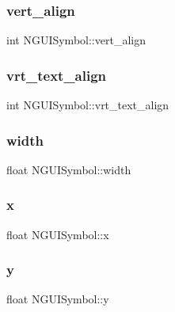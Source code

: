 \hypertarget{class_n_g_u_i_symbol_acdc9d16a07feb428f3323e4760c34b0d}{}\label{class_n_g_u_i_symbol_acdc9d16a07feb428f3323e4760c34b0d} 
\subsubsection{\texorpdfstring{vert\+\_\+align}{vert\_align}}
{\footnotesize\ttfamily int N\+G\+U\+I\+Symbol\+::vert\+\_\+align}

\hypertarget{class_n_g_u_i_symbol_a2f3a6203639494f8a335d10e918abc56}{}\label{class_n_g_u_i_symbol_a2f3a6203639494f8a335d10e918abc56} 
\subsubsection{\texorpdfstring{vrt\+\_\+text\+\_\+align}{vrt\_text\_align}}
{\footnotesize\ttfamily int N\+G\+U\+I\+Symbol\+::vrt\+\_\+text\+\_\+align}

\hypertarget{class_n_g_u_i_symbol_a7d7b265a935a557cb41599e3fa82bc47}{}\label{class_n_g_u_i_symbol_a7d7b265a935a557cb41599e3fa82bc47} 
\subsubsection{\texorpdfstring{width}{width}}
{\footnotesize\ttfamily float N\+G\+U\+I\+Symbol\+::width}

\hypertarget{class_n_g_u_i_symbol_a0b3df7c3753e7c006504c29672b06282}{}\label{class_n_g_u_i_symbol_a0b3df7c3753e7c006504c29672b06282} 
\subsubsection{\texorpdfstring{x}{x}}
{\footnotesize\ttfamily float N\+G\+U\+I\+Symbol\+::x}

\hypertarget{class_n_g_u_i_symbol_a9be66cc67b8c488815c9f9b64cc5040c}{}\label{class_n_g_u_i_symbol_a9be66cc67b8c488815c9f9b64cc5040c} 
\subsubsection{\texorpdfstring{y}{y}}
{\footnotesize\ttfamily float N\+G\+U\+I\+Symbol\+::y}

